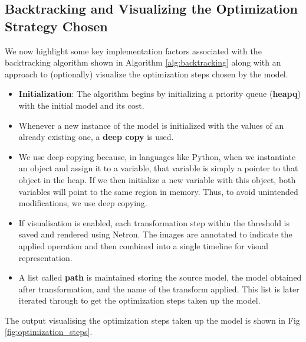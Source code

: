 \documentclass[12pt,a4paper,twoside,openright,bibliography=totocnumbered]{report}
\begin{document}
\subsection{Backtracking and Visualizing the Optimization Strategy Chosen}
    We now highlight some key implementation factors associated with the backtracking algorithm shown in Algorithm \ref{alg:backtracking} along with an approach to (optionally) visualize the optimization steps chosen by the model.
    \begin{itemize}
        \item \textbf{Initialization}: The algorithm begins by initializing a priority queue (\textbf{heapq}) with the initial model and its cost.
        \item Whenever a new instance of the model is initialized with the values of an already existing one, a \textbf{deep copy} is used. 
        \item We use deep copying because, in languages like Python, when we instantiate an object and assign it to a variable, that variable is simply a pointer to that object in the heap. If we then initialize a new variable with this object, both variables will point to the same region in memory. Thus, to avoid unintended modifications, we use deep copying.
        \item If visualisation is enabled, each transformation step within the threshold is saved and rendered using Netron. The images are annotated to indicate the applied operation and then combined into a single timeline for visual representation.
        \item A list called \textbf{path} is maintained storing the source model, the model obtained after transformation, and the name of the transform applied. This list is later iterated through to get the optimization steps taken up the model.
    \end{itemize}
    The output visualising the optimization steps taken up the model is shown in Fig \ref{fig:optimization_steps}.
\end{document}
